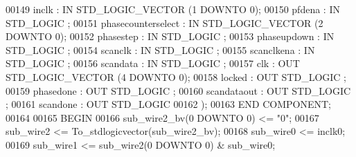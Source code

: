 \begin{DoxyCode}
{00149             inclk   : \textcolor{keywordflow}{IN} \textcolor{comment}{STD\_LOGIC\_VECTOR} (\textcolor{vhdllogic}{}\textcolor{vhdllogic}{1} \textcolor{keywordflow}{DOWNTO} \textcolor{vhdllogic}{}\textcolor{vhdllogic}{0});
00150             pfdena  : \textcolor{keywordflow}{IN} \textcolor{comment}{STD\_LOGIC} ;
00151             phasecounterselect  : \textcolor{keywordflow}{IN} \textcolor{comment}{STD\_LOGIC\_VECTOR} (\textcolor{vhdllogic}{}\textcolor{vhdllogic}{2} \textcolor{keywordflow}{DOWNTO} \textcolor{vhdllogic}{}\textcolor{vhdllogic}{0});
00152             phasestep   : \textcolor{keywordflow}{IN} \textcolor{comment}{STD\_LOGIC} ;
00153             phaseupdown : \textcolor{keywordflow}{IN} \textcolor{comment}{STD\_LOGIC} ;
00154             scanclk : \textcolor{keywordflow}{IN} \textcolor{comment}{STD\_LOGIC} ;
00155             scanclkena  : \textcolor{keywordflow}{IN} \textcolor{comment}{STD\_LOGIC} ;
00156             scandata    : \textcolor{keywordflow}{IN} \textcolor{comment}{STD\_LOGIC} ;
00157             clk : \textcolor{keywordflow}{OUT} \textcolor{comment}{STD\_LOGIC\_VECTOR} (\textcolor{vhdllogic}{}\textcolor{vhdllogic}{4} \textcolor{keywordflow}{DOWNTO} \textcolor{vhdllogic}{}\textcolor{vhdllogic}{0});
00158             locked  : \textcolor{keywordflow}{OUT} \textcolor{comment}{STD\_LOGIC} ;
00159             phasedone   : \textcolor{keywordflow}{OUT} \textcolor{comment}{STD\_LOGIC} ;
00160             scandataout : \textcolor{keywordflow}{OUT} \textcolor{comment}{STD\_LOGIC} ;
00161             scandone    : \textcolor{keywordflow}{OUT} \textcolor{comment}{STD\_LOGIC} 
00162     );
00163     \textcolor{keywordflow}{END} \textcolor{keywordflow}{COMPONENT};
00164 
00165 \textcolor{vhdlkeyword}{BEGIN}
00166     \textcolor{vhdlchar}{sub_wire2_bv}\textcolor{vhdlchar}{(}\textcolor{vhdllogic}{}\textcolor{vhdllogic}{0} \textcolor{keywordflow}{DOWNTO} \textcolor{vhdllogic}{}\textcolor{vhdllogic}{0}\textcolor{vhdlchar}{)} \textcolor{vhdlchar}{<=} \textcolor{vhdllogic}{"0"};
00167     \textcolor{vhdlchar}{sub_wire2}    \textcolor{vhdlchar}{<=} \textcolor{vhdlchar}{To\_stdlogicvector}\textcolor{vhdlchar}{(}\textcolor{vhdlchar}{sub_wire2_bv}\textcolor{vhdlchar}{)};
00168     \textcolor{vhdlchar}{sub_wire0}    \textcolor{vhdlchar}{<=} \textcolor{vhdlchar}{inclk0};
00169     \textcolor{vhdlchar}{sub_wire1}    \textcolor{vhdlchar}{<=} \textcolor{vhdlchar}{sub_wire2}\textcolor{vhdlchar}{(}\textcolor{vhdllogic}{}\textcolor{vhdllogic}{0} \textcolor{keywordflow}{DOWNTO} \textcolor{vhdllogic}{}\textcolor{vhdllogic}{0}\textcolor{vhdlchar}{)} \textcolor{vhdlchar}{&} \textcolor{vhdlchar}{sub_wire0};
}
\end{DoxyCode}
